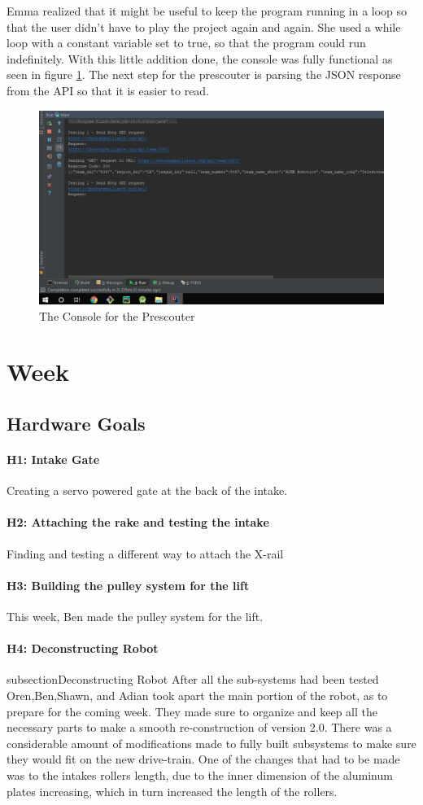 \documentclass{article}
\begin{document}
Emma realized that it might be useful to keep the program running in a loop so that the user didn't have to play the project again and again. She used a while loop with a constant variable set to true, so that the program could run indefinitely. With this little addition done, the console was fully functional as seen in figure \ref{fig:console}. The next step for the prescouter is parsing the JSON response from the API so that it is easier to read. 

\begin{figure}
    \centering
    \includegraphics[width=.6 \textwidth]{15_12-10/images/console.png}
    \caption{The Console for the Prescouter}
    \label{fig:console}
\end{figure}
\clearpage \newpage \section{Week \thesection} 
\subsection{Hardware Goals}
\paragraph{H1: Intake Gate}
 Creating a servo powered gate at the back of the intake.
\paragraph{H2: Attaching the rake and testing the intake}
 Finding and testing a different way to attach the X-rail
\paragraph{H3: Building the pulley system for the lift}
This week, Ben made the pulley system for the lift.
\paragraph{H4: Deconstructing Robot}
subsection{Deconstructing Robot}
After all the sub-systems had been tested Oren,Ben,Shawn, and Adian took apart the main portion of the robot, as to prepare for the coming week. They made sure to organize and keep all the necessary parts to make a smooth re-construction of version 2.0. There was a considerable amount of modifications made to fully built subsystems to make sure they would fit on the new drive-train. One of the changes that had to be made was to the intakes rollers length, due to the inner dimension of the aluminum plates increasing, which in turn increased the length of the rollers.
\end{document}
